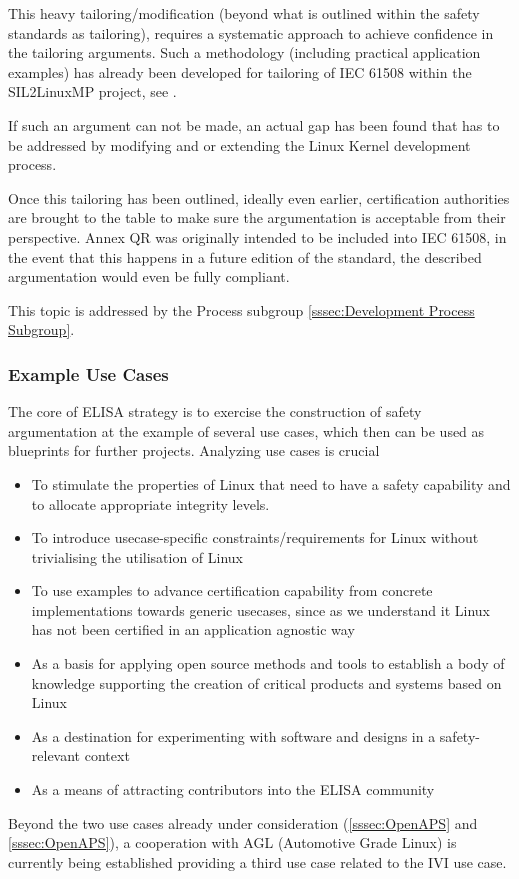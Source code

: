\documentclass[12pt]{ElisaPaper}
\begin{document}
This heavy tailoring/modification (beyond what is outlined within the safety standards as tailoring), requires a systematic approach to achieve confidence in the tailoring arguments.
Such a methodology (including practical application examples) has already been developed for tailoring of IEC 61508 within the SIL2LinuxMP project, see \cite{AnnexQR}.

If such an argument can not be made, an actual gap has been found that has to be addressed by modifying and or extending the Linux Kernel development process.

Once this tailoring has been outlined, ideally even earlier, certification authorities are brought to the table to make sure the argumentation is acceptable from their perspective.
Annex QR was originally intended to be included into IEC 61508, in the event that this happens in a future edition of the standard, the described argumentation would even be fully compliant.

This topic is addressed by the Process subgroup \ref{sssec:Development Process Subgroup}.
\subsubsection{Example Use Cases}
The core of ELISA strategy is to exercise the construction of safety argumentation at the example of several use cases, which then can be used as blueprints for further projects.
Analyzing use cases is crucial
\begin{itemize}
	\item 
To stimulate the properties of Linux that need to have a safety capability and to allocate appropriate integrity levels.
\item 
To introduce usecase-specific constraints/requirements for Linux without trivialising the utilisation of Linux
\item 
To use examples to advance certification capability from concrete implementations towards generic usecases, since as we understand it Linux has not been certified in an application agnostic way
\item 
As a basis for applying open source methods and tools to establish a body of knowledge supporting the creation of critical products and systems based on Linux
\item 
As a destination for experimenting with software and designs in a safety-relevant context
\item 
As a means of attracting contributors into the ELISA community
\end{itemize}
Beyond the two use cases already under consideration (\ref{sssec:OpenAPS} and \ref{sssec:OpenAPS}), a cooperation with AGL (Automotive Grade Linux) is currently being established providing a third use case related to the IVI use case.
\end{document}
